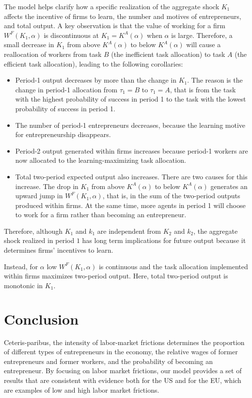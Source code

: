 \documentclass[12pt,american]{paper}
\theoremstyle{remark}
\begin{document}
The model helps clarify how a specific realization of the aggregate shock $K_1$ affects the incentive of firms to learn, the number and motives of entrepreneurs, and total output. A key observation is that the value of working for a firm $W^F(K_1,\alpha)$ is discontinuous at $K_1=K^A(\alpha)$  when $\alpha$ is  large. Therefore, a small decrease in $K_1$ from above $K^A(\alpha)$ to below $K^A(\alpha)$ will cause a reallocation of workers from task $B$ (the inefficient task allocation) to task $A$ (the efficient task allocation), leading to the following corollaries:
\begin{itemize}\setlength\itemsep{0.1em}
\item Period-1 output decreases by more than the change in $K_1$. The reason is the change in period-1 allocation from $\tau_1=B$ to $\tau_1=A$, that is from the task with the highest probability of success in period 1 to the task with the lowest probability of success in period 1.
\item The number of period-1 entrepreneurs decreases, because the learning motive for entrepreneurship disappears.
\item Period-2 output generated within firms increases because period-1 workers are now allocated to the learning-maximizing task allocation.
\item Total two-period expected output also increases. There are two causes for this increase. The drop in $K_1$ from above $K^A(\alpha)$ to below $K^A(\alpha)$   generates an upward jump in $W^F(K_1,\alpha)$, that is, in the sum of the two-period outputs produced within firms. At the same time, more agents in period 1 will choose to work for a firm rather than becoming an entrepreneur. 
\end{itemize}
%
Therefore, although $K_1$ and $k_1$ are independent from $K_2$ and $k_2$, the  aggregate shock realized in period $1$ has long term implications for future output because it determines firms' incentives to learn. 

Instead, for $\alpha$ low $W^F(K_1,\alpha)$ is continuous and the task allocation implemented within firms  maximizes two-period output. Here, total two-period output is monotonic in $K_1$.


\section{Conclusion}\label{conclusion}
%
Ceteris-paribus, the intensity of labor-market frictions determines the proportion of different types of entrepreneurs in the economy, the relative wages of former entrepreneurs and former workers, and the probability of becoming an entrepreneur. By focusing on labor market frictions, our model provides a set of results that are consistent with evidence both for the US and for the EU, which are examples of low and high labor market frictions.
\end{document}
